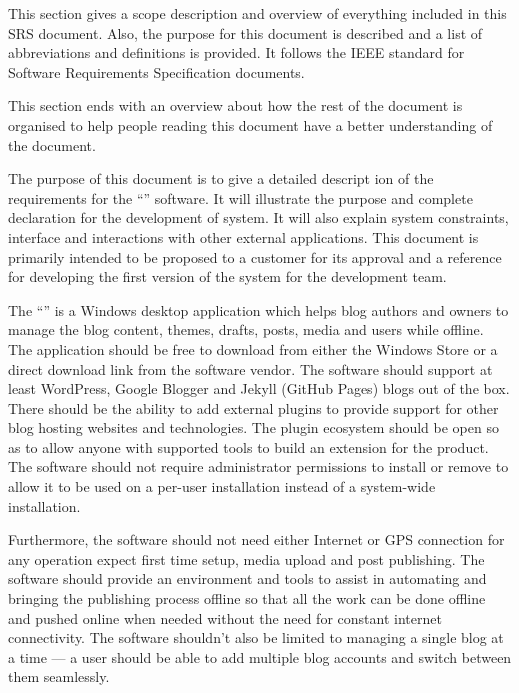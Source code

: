 
This section gives a scope description and overview of everything included in this SRS document. Also, the purpose for
this document is described and a list of abbreviations and definitions is provided. It follows the IEEE standard for
Software Requirements Specification documents.

This section ends with an overview about how the rest of the document is organised to help people reading this document
have a better understanding of the document.


The purpose of this document is to give a detailed descript ion of the requirements for the ``\projectTitle{}'' software. It will illustrate the purpose and complete declaration for the development of system. It will also
explain system constraints, interface and interactions with other external applications. This document is primarily
intended to be proposed to a customer for its approval and a reference for developing the first version of the system
for the development team.


The ``\projectTitle{}'' is a Windows desktop application which helps blog authors and owners to manage the blog content,
themes, drafts, posts, media and users while offline. The application should be free to download from either the Windows
Store or a direct download link from the software vendor. The software should support at least WordPress, Google Blogger
and Jekyll (GitHub Pages) blogs out of the box. There should be the ability to add external plugins to provide support
for other blog hosting websites and technologies. The plugin ecosystem should be open so as to allow anyone with
supported tools to build an extension for the product. The software should not require administrator permissions to
install or remove to allow it to be used on a per-user installation instead of a system-wide installation.

Furthermore, the software should not need either Internet or GPS connection for any operation expect first time setup,
media upload and post publishing. The software should provide an environment and tools to assist in automating and
bringing the publishing process offline so that all the work can be done offline and pushed online when needed without
the need for constant internet connectivity. The software shouldn't also be limited to managing a single blog at a time
--- a user should be able to add multiple blog accounts and switch between them seamlessly.

